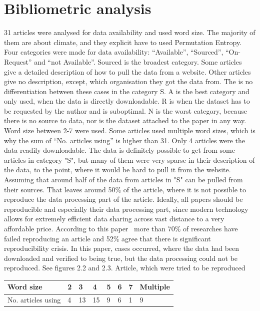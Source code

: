 \section{Bibliometric analysis}
31 articles were analysed for data availability and used word size. The majority of them are about climate, and they explicit have to used Permutation Entropy. Four categories were made for data availability: “Available”, “Sourced”, “On-Request” and “not Available”. Sourced is the broadest category. Some articles give a detailed description of how to pull the data from a website. Other articles give no description, except, which organisation they got the data from. The is no differentiation between these cases in the category S. A is the best category and only used, when the data is directly downloadable. R is when the dataset has to be requested by the author and is suboptimal. N is the worst category, because there is no source to data, nor is the dataset attached to the paper in any way. Word size between 2-7 were used. Some articles used multiple word sizes, which is why the sum of “No. articles using” is higher than 31. Only 4 articles were the data readily downloadable. The data is definitely possible to get from some articles in category "S", but many of them were very sparse in their description of the data, to the point, where it would be hard to pull it from the website. Assuming that around half of the data from articles in "S" can be pulled from their sources. That leaves around 50\% of the article, where it is not possible to reproduce the data processing part of the article. Ideally, all papers should be reproducible and especially their data processing part, since modern technology allows for extremely efficient data sharing across vast distance to a very affordable price. According to this paper~\cite{Baker2016} more than 70\% of researches have failed reproducing an article and 52\% agree that there is significant reproducibility crisis. In this paper, cases occurred, where the data had been downloaded and verified to being true, but the data processing could not be reproduced. See figures 2.2 and 2.3. Article, which were tried to be reproduced~\cite{Saco2010}


\begin{table}[]
\begin{tabular}{|l|l|l|l|l|l|l|l|}
\hline
Word size & 2 & 3  & 4  & 5 & 6 & 7 & Multiple \\ \hline
No. articles using  & 4 & 13 & 15 & 9 & 6 & 1 & 9        \\ \hline
\end{tabular}
\end{table}

